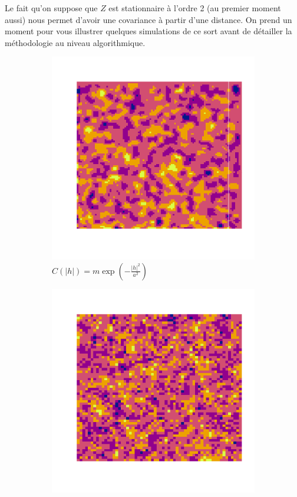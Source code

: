 \documentclass[10pt]{article} %
\begin{document}
Le fait qu'on suppose que $Z$ est stationnaire à l'ordre 2 (au premier moment aussi) nous permet d'avoir une covariance à partir d'une distance. On prend un moment pour vous illustrer
quelques simulations de ce sort avant de détailler la méthodologie au niveau algorithmique.

\begin{figure}[h!]
    \centering
    \begin{subfigure}[b]{0.3\textwidth}
        \centering
        \includegraphics[width=\textwidth]{media/gauss_plasma.png}
        \caption{$C(|h|) = m \exp(-\frac{|h|^2}{a^2})$}
        \label{gauss plasma}
    \end{subfigure}
    \hfill
    \begin{subfigure}[b]{0.3\textwidth}
        \centering
        \includegraphics[width=\textwidth]{media/tent.png}

\end{subfigure}
\end{figure}
\end{document}

